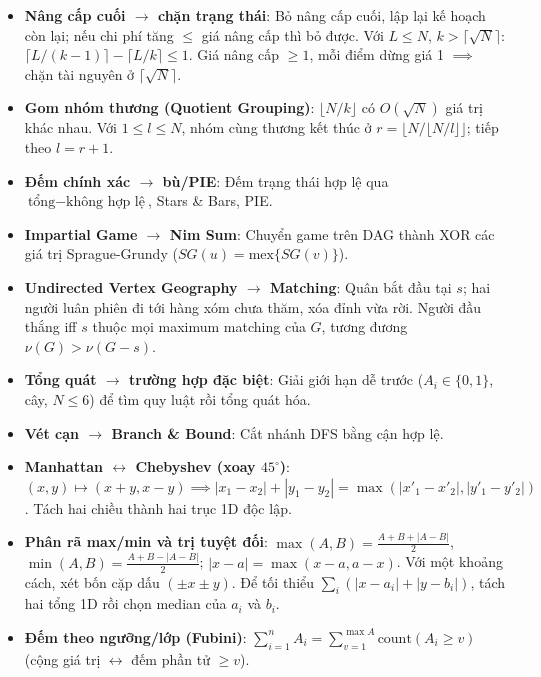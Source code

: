 \begin{itemize}
    \item \textbf{Nâng cấp cuối $\to$ chặn trạng thái}: Bỏ nâng cấp cuối, lập lại kế hoạch còn lại; nếu chi phí tăng $\le$ giá nâng cấp thì bỏ được. Với $L\le N$, $k>\lceil\sqrt N\rceil$: $\lceil L/(k-1)\rceil-\lceil L/k\rceil\le1$. Giá nâng cấp $\ge1$, mỗi điểm dừng giá 1 $\implies$ chặn tài nguyên ở $\lceil\sqrt N\rceil$.

    \item \textbf{Gom nhóm thương (Quotient Grouping)}: $\lfloor N/k\rfloor$ có $O(\sqrt N)$ giá trị khác nhau. Với $1\le l\le N$, nhóm cùng thương kết thúc ở $r=\lfloor N/\lfloor N/l\rfloor\rfloor$; tiếp theo $l=r+1$.

    \item \textbf{Đếm chính xác $\to$ bù/PIE}: Đếm trạng thái hợp lệ qua $\text{tổng}-\text{không hợp lệ}$, Stars \& Bars, PIE.

    \item \textbf{Impartial Game $\to$ Nim Sum}: Chuyển game trên DAG thành XOR các giá trị Sprague-Grundy ($SG(u)=\text{mex}\{SG(v)\}$).

    \item \textbf{Undirected Vertex Geography $\to$ Matching}: Quân bắt đầu tại $s$; hai người luân phiên đi tới hàng xóm chưa thăm, xóa đỉnh vừa rời. Người đầu thắng iff $s$ thuộc mọi maximum matching của $G$, tương đương $\nu(G)>\nu(G-s)$.

    \item \textbf{Tổng quát $\to$ trường hợp đặc biệt}: Giải giới hạn dễ trước ($A_i\in\{0,1\}$, cây, $N\le6$) để tìm quy luật rồi tổng quát hóa.

    \item \textbf{Vét cạn $\to$ Branch \& Bound}: Cắt nhánh DFS bằng cận hợp lệ.

    \item \textbf{Manhattan $\leftrightarrow$ Chebyshev (xoay $45^\circ$)}: $(x,y)\mapsto(x+y,x-y)\implies|x_1-x_2|+|y_1-y_2|=\max(|x'_1-x'_2|,|y'_1-y'_2|)$. Tách hai chiều thành hai trục 1D độc lập.

    \item \textbf{Phân rã max/min và trị tuyệt đối}: $\max(A,B)=\frac{A+B+|A-B|}{2}$, $\min(A,B)=\frac{A+B-|A-B|}{2}$; $|x-a|=\max(x-a,a-x)$. Với một khoảng cách, xét bốn cặp dấu $(\pm x\pm y)$. Để tối thiểu $\sum_i(|x-a_i|+|y-b_i|)$, tách hai tổng 1D rồi chọn median của $a_i$ và $b_i$.

    \item \textbf{Đếm theo ngưỡng/lớp (Fubini)}: $\sum_{i=1}^nA_i=\sum_{v=1}^{\max A}\text{count}(A_i\ge v)$ (cộng giá trị $\longleftrightarrow$ đếm phần tử $\ge v$).


\end{itemize}
